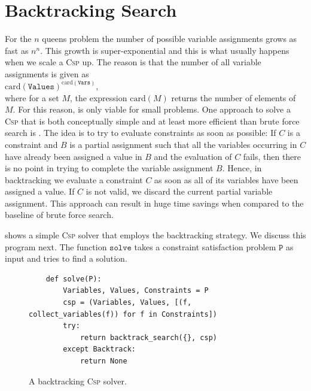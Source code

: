 \section{Backtracking Search}
For the $n$ queens problem the number of possible variable assignments grows as fast as $n^n$.
This growth is super-exponential and this is what usually happens when we scale a \textsc{Csp} up. 
The reason is that the number of all variable assignments is given as
\\[0.2cm]
\hspace*{1.3cm}
$\mathrm{card}(\texttt{Values})^{\mathrm{card}(\texttt{Vars})}$,
\\[0.2cm]
where for a set $M$, the expression $\mathrm{card}(M)$ returns the number of elements of $M$.
For this reason,  is only viable for small problems.  One approach to solve a \textsc{Csp}
that is both conceptually simple and at least more efficient than brute force search is .  The idea
is to try to evaluate constraints as soon as possible:  If $C$ is a constraint and $B$ is a partial assignment
such that all the variables occurring in $C$ have already been assigned a value in $B$ and the evaluation of $C$
fails, then there is no point in trying to complete the variable assignment $B$.  Hence, in backtracking we
evaluate a constraint $C$ as soon as all of its variables have been assigned a value.  If $C$ is not valid, we
discard the current partial variable assignment.  This approach can result in huge time savings
when compared to the baseline of brute force search.

 shows a simple \textsc{Csp} solver 
that employs the backtracking strategy.  
We discuss this program next.  The function $\texttt{solve}$ takes a constraint
satisfaction problem $\texttt{P}$ as input and tries to find a solution.  


\begin{figure}[!ht]
\centering
\begin{verbatim}
    def solve(P):
        Variables, Values, Constraints = P
        csp = (Variables, Values, [(f, collect_variables(f)) for f in Constraints])
        try:
            return backtrack_search({}, csp)
        except Backtrack:
            return None
\end{verbatim}
\vspace*{-0.3cm}
\caption{A backtracking \textsc{Csp} solver.}
\label{fig:Backtrack-Solver.ipynb}
\end{figure}

